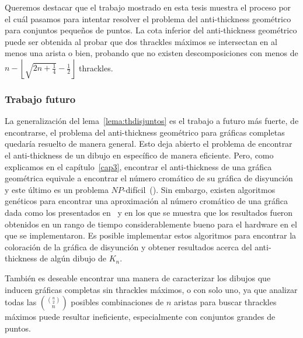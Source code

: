 Queremos destacar que el trabajo mostrado en esta tesis muestra el proceso por el cuál pasamos para
intentar resolver el problema del anti-thickness geométrico para conjuntos pequeños de puntos. La cota
inferior del anti-thickness geométrico puede ser obtenida al probar que dos thrackles máximos se
intersectan en al menos una arista o bien, probando que no existen descomposiciones con menos de $n -
\left\lfloor \sqrt{2n + \frac{1}{4}} - \frac{1}{2}\right\rfloor$ thrackles.


\subsubsection{Trabajo futuro}

La generalización del lema~\ref{lema:thdisjuntos} es el trabajo a futuro más fuerte, de encontrarse, el
problema del anti-thickness geométrico para gráficas completas quedaría resuelto de manera general. Esto
deja abierto el problema de encontrar el anti-thickness de un dibujo en específico de manera eficiente.
Pero, como explicamos en el capítulo~\ref{cap3}, encontrar el anti-thickness de una gráfica geométrica
equivale a encontrar el número cromático de su gráfica de disyunción y este último es un problema
$NP$-difícil~(\cite{Skiena2003}). Sin embargo, existen algoritmos genéticos para encontrar una aproximación
al número cromático de una gráfica dada como los presentados en~\cite{Fleurent1996} y \cite{Galinier1999}
en los que se muestra que los resultados fueron obtenidos en un rango de tiempo considerablemente bueno
para el hardware en el que se implementaron. Es posible implementar estos algoritmos para encontrar la
coloración de la gráfica de disyunción y obtener resultados acerca del anti-thickness de algún dibujo de
$K_n$.

También es deseable encontrar una manera de caracterizar los dibujos que inducen gráficas completas sin
thrackles máximos, o con solo uno, ya que analizar todas las $\displaystyle \binom{\binom{n}{2}}{n}$
posibles combinaciones de $n$ aristas para buscar thrackles máximos puede resultar ineficiente,
especialmente con conjuntos grandes de puntos.
